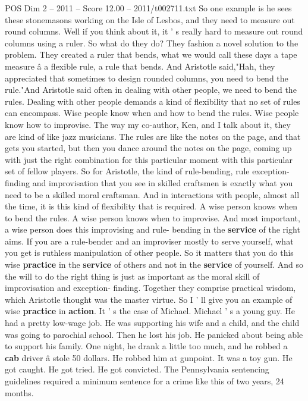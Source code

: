 \begin{textsample}{POS Dim 2 – 2011 – Score 12.00 – 2011/t002711.txt}
So one example is he sees these stonemasons working on the Isle of Lesbos, and they need to measure out round columns.
Well if you think about it, it ' s really hard to measure out round columns using a ruler.
So what do they do?
They fashion a novel solution to the problem.
They created a ruler that bends, what we would call these days a tape measure â a flexible rule, a rule that bends.
And Aristotle said,"Hah, they appreciated that sometimes to design rounded columns, you need to bend the rule."And Aristotle said often in dealing with other people, we need to bend the rules.
Dealing with other people demands a kind of flexibility that no set of rules can encompass.
Wise people know when and how to bend the rules.
Wise people know how to improvise.
The way my co-author, Ken, and I talk about it, they are kind of like jazz musicians.
The rules are like the notes on the page, and that gets you started, but then you dance around the notes on the page, coming up with just the right combination for this particular moment with this particular set of fellow players.
So for Aristotle, the kind of rule-bending, rule exception-finding and improvisation that you see in skilled craftsmen is exactly what you need to be a skilled moral craftsman.
And in interactions with people, almost all the time, it is this kind of flexibility that is required.
A wise person knows when to bend the rules.
A wise person knows when to improvise.
And most important, a wise person does this improvising and rule- bending in the \textbf{service} of the right aims.
If you are a rule-bender and an improviser mostly to serve yourself, what you get is ruthless manipulation of other people.
So it matters that you do this wise \textbf{practice} in the \textbf{service} of others and not in the \textbf{service} of yourself.
And so the will to do the right thing is just as important as the moral skill of improvisation and exception- finding.
Together they comprise practical wisdom, which Aristotle thought was the master virtue.
So I ' ll give you an example of wise \textbf{practice} in \textbf{action}.
It ' s the case of Michael.
Michael ' s a young guy.
He had a pretty low-wage job.
He was supporting his wife and a child, and the child was going to parochial school.
Then he lost his job.
He panicked about being able to support his family.
One night, he drank a little too much, and he robbed a \textbf{cab} driver â stole 50 dollars.
He robbed him at gunpoint.
It was a toy gun.
He got caught.
He got tried.
He got convicted.
The Pennsylvania sentencing guidelines required a minimum sentence for a crime like this of two years, 24 months.

\end{textsample}
